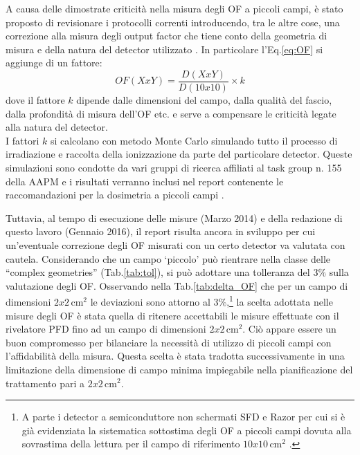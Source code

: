 A causa delle dimostrate criticità nella misura degli OF a piccoli campi, è stato proposto di revisionare i protocolli correnti introducendo, tra le altre cose, una correzione alla misura degli output factor che tiene conto della geometria di misura e della natura del detector utilizzato \cite{Alfonso2008}. In particolare l'Eq.\eqref{eq:OF} si aggiunge di un fattore:
\begin{equation}
OF(XxY)=\frac{D(XxY)}{D(10x10)}\times k
\end{equation}
dove il fattore $k$ dipende dalle dimensioni del campo, dalla qualità del fascio, dalla profondità di misura dell'OF etc. e serve a compensare le criticità legate alla natura del detector.\\
I fattori $k$ si calcolano con metodo Monte Carlo simulando tutto il processo di irradiazione e raccolta della ionizzazione da parte del particolare detector. Queste simulazioni sono condotte da vari gruppi di ricerca affiliati al task group n. 155 della AAPM e i risultati verranno inclusi nel report contenente le raccomandazioni per la dosimetria a piccoli campi \cite{AAPMTG155}. 

Tuttavia, al tempo di esecuzione delle misure (Marzo 2014) e della redazione di questo lavoro (Gennaio 2016), il report risulta ancora in sviluppo per cui un'eventuale correzione degli OF misurati con un certo detector va valutata con cautela. Considerando che un campo `piccolo' può rientrare nella classe delle ``complex geometries'' (Tab.\ref{tab:tol}), si può adottare una tolleranza del $3\%$ sulla valutazione degli OF. Osservando nella Tab.\ref{tab:delta_OF} che per un campo di dimensioni $2x2\,$cm$^2$ le deviazioni sono attorno al $3\%$,\footnote{A parte i detector a semiconduttore non schermati SFD e Razor per cui si è già evidenziata la sistematica sottostima degli OF a piccoli campi dovuta alla sovrastima della lettura per il campo di riferimento $10x10\,$cm$^2$ \cite{Griessbach2005}.} la scelta adottata nelle misure degli OF è stata quella di ritenere accettabili le misure effettuate con il rivelatore PFD fino ad un campo di dimensioni $2x2\,$cm$^2$. Ciò appare essere un buon compromesso per bilanciare la necessità di utilizzo di piccoli campi con l'affidabilità della misura. Questa scelta è stata tradotta successivamente in una limitazione della dimensione di campo minima impiegabile nella pianificazione del trattamento pari a $2x2\,$cm$^2$.

